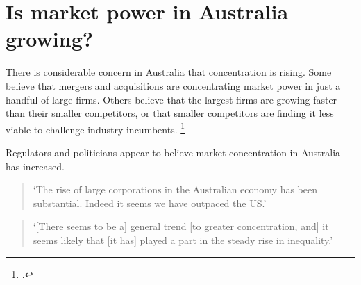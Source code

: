 \chapter{Is market power in Australia growing?\label{chap:trends}}

There is considerable concern in Australia that concentration is rising. Some believe that mergers and acquisitions are concentrating market power in just a handful of large firms. Others believe that the largest firms are growing faster than their smaller competitors, or that smaller competitors are finding it less viable to challenge industry incumbents.%
    \footcites{Janda_merger_2008}{IBISWorld_Bunnings_2015}{Bouris_BigBusiness_2015}

Regulators and politicians appear to believe market concentration in Australia has increased.

\begin{quote}
    `The rise of large corporations in the Australian economy has been substantial. Indeed it seems we have outpaced the US.'

\end{quote}

\begin{quote}
    `[There seems to be a] general trend [to greater concentration, and] it seems likely that [it has] played a part in the steady rise in inequality.'

\end{quote}





